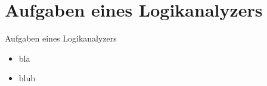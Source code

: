 \section{Aufgaben eines Logikanalyzers}
\begin{frame}[<+->]{Aufgaben eines Logikanalyzers}
    \begin{itemize}
        \item bla
        \item blub
    \end{itemize}
\end{frame}
